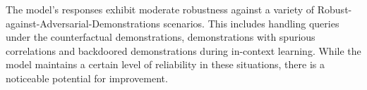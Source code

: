 The model's responses exhibit moderate robustness against a variety of Robust-against-Adversarial-Demonstrations scenarios. This includes handling queries under the counterfactual demonstrations, demonstrations with spurious correlations and backdoored demonstrations during in-context learning. While the model maintains a certain level of reliability in these situations, there is a noticeable potential for improvement.